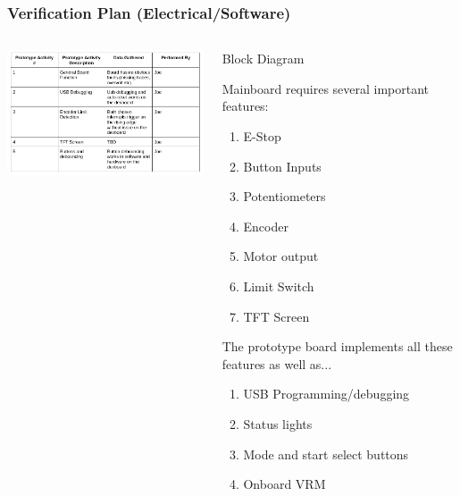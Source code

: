 \documentclass[aspectratio=169]{beamer}
\begin{document}
\begin{frame}
    \frametitle{Verification Plan (Electrical/Software)}

    \begin{columns}
        \begin{column}{0.58\textwidth}
            \includegraphics[width=8.5cm]{ElectricalPrototype}
        \end{column}

        \begin{column}{0.40\textwidth}
            \begin{block}{Block Diagram}
                \tiny{
                    Mainboard requires several important features:
                    \begin{enumerate}
                        \item E-Stop
                        \item Button Inputs
                        \item Potentiometers
                        \item Encoder
                        \item Motor output
                        \item Limit Switch
                        \item TFT Screen
                    \end{enumerate}

                    The prototype board implements all these features as well as...
                    \begin{enumerate}
                        \item USB Programming/debugging
                        \item Status lights
                        \item Mode and start select buttons
                        \item Onboard VRM
                    \end{enumerate}
                }
            \end{block}
        \end{column}
    \end{columns}

\end{frame}
\end{document}
